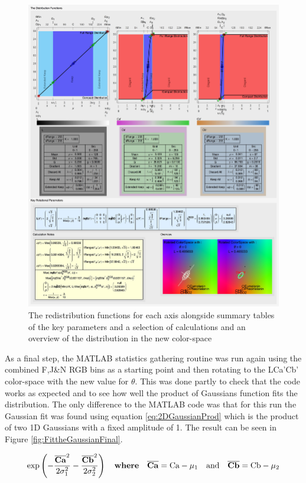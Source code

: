\begin{figure}[h!]
  \centering
  \includegraphics[width=1.0 \textwidth]{Chapter3/Figs/Distribution_Results.jpg} 
    \caption{ The redistribution functions for each axis alongside summary tables of the key parameters and a selection of calculations and an overview of the distribution in the new color-space  }  \label{fig:DistributionResults}
\end{figure}

As a final step, the MATLAB statistics gathering routine was run again using the combined F,J\&N RGB bins as a starting point and then rotating to the LCa'Cb' color-space with the new value for $\theta$. This was done partly to check that the code works as expected and to see how well the product of Gaussians function fits the distribution. The only difference to the MATLAB code was that for this run the Gaussian fit was found using equation \ref{eq:2DGaussianProd} which is the product of two 1D Gaussians with a fixed amplitude of 1. The result can be seen in Figure \ref{fig:FittheGaussianFinal}. 

\begin{equation}\label{eq:2DGaussianProd}
\exp \left( -\frac{{\overline{\mathbf{Ca}}}^2}{2 \sigma_1^2} -  \frac{ { \overline{\mathbf{Cb}} }^2}{2 \sigma_2^2} \right) \quad \textbf{where} \quad \overline{\mathbf{Ca}} = \text{Ca}-\mu_1 \quad \text{and} \quad \overline{\mathbf{Cb}} = \text{Cb}-\mu_2 
\end{equation}



